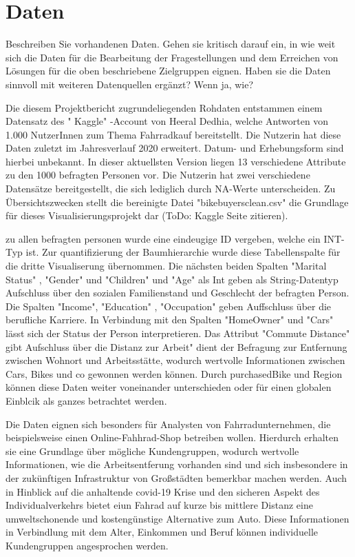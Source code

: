 \documentclass[usegeometry=true]{scrartcl}
\begin{document}
\section{Daten}
Beschreiben Sie vorhandenen Daten. Gehen sie kritisch darauf ein, in wie weit sich die Daten für die Bearbeitung der Fragestellungen und dem Erreichen von Lösungen für die oben beschriebene Zielgruppen eignen. Haben sie die Daten sinnvoll mit weiteren Datenquellen ergänzt? Wenn ja, wie?

Die diesem Projektbericht zugrundeliegenden Rohdaten entstammen einem Datensatz des " Kaggle" -Account von Heeral Dedhia, welche Antworten von 1.000 NutzerInnen zum Thema Fahrradkauf bereitstellt. Die Nutzerin hat diese Daten zuletzt im Jahresverlauf 2020 erweitert. Datum- und Erhebungsform sind hierbei unbekannt. In dieser aktuellsten Version liegen 13 verschiedene Attribute zu den 1000 befragten Personen vor. Die Nutzerin hat zwei verschiedene Datensätze bereitgestellt, die sich lediglich durch NA-Werte unterscheiden. Zu Übersichtszwecken stellt die bereinigte Datei "bikebuyersclean.csv" die Grundlage für dieses Visualisierungsprojekt dar (ToDo: Kaggle Seite zitieren). 

zu allen befragten personen wurde eine eindeugige ID vergeben, welche ein INT-Typ ist. Zur quantifizierung der Baumhierarchie wurde diese Tabellenspalte für die dritte Visualiserung übernommen. Die nächsten beiden Spalten "Marital Status" , "Gender" und "Children" und "Age" als Int geben als String-Datentyp Aufschluss über den sozialen  Familienstand und Geschlecht der befragten Person. Die Spalten "Income", "Education" , "Occupation" geben Auffschluss über die berufliche Karriere. In Verbindung mit den Spalten "HomeOwner" und "Cars" lässt sich der Status der Person interpretieren. Das Attribut "Commute Distance" gibt Aufschluss über die Distanz zur Arbeit" dient der Befragung zur Entfernung zwischen Wohnort und Arbeitsstätte, wodurch wertvolle Informationen zwischen Cars, Bikes und co gewonnen werden können. Durch purchasedBike und Region können diese Daten weiter voneinander unterschieden oder für einen globalen Einblcik als ganzes betrachtet werden. 

Die Daten eignen sich besonders für Analysten von Fahrradunternehmen, die beispielsweise einen Online-Fahhrad-Shop betreiben wollen. Hierdurch erhalten sie eine Grundlage über mögliche Kundengruppen, wodurch wertvolle Informationen, wie die Arbeitsentferung vorhanden sind und sich insbesondere in der zukünftigen Infrastruktur von Großstädten bemerkbar machen werden. Auch in Hinblick auf die anhaltende covid-19 Krise und den sicheren Aspekt des Individualverkehrs bietet eiun Fahrad auf kurze bis mittlere Distanz eine umweltschonende und kostengünstige Alternative zum Auto. 
Diese Informationen in Verbindlung mit dem Alter, Einkommen und Beruf können individuelle Kundengruppen angesprochen werden. 
\end{document}
